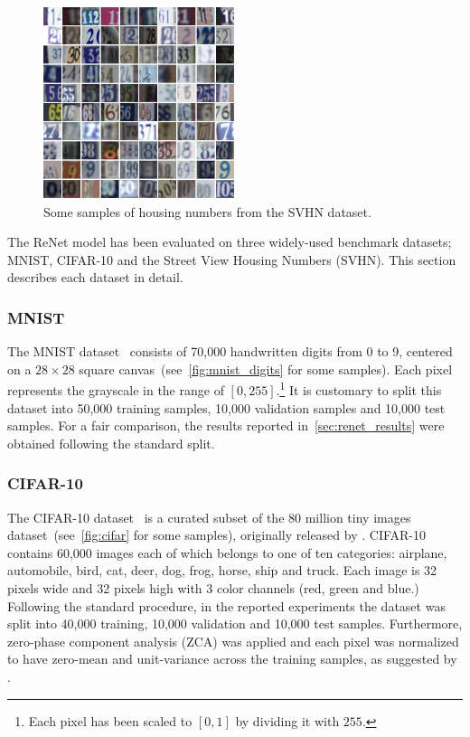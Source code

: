 \begin{figure}[!t]
    \centering
    \includegraphics[width=0.5\textwidth]{img/renet/SVHN.png}
    \caption{Some samples of housing numbers from the SVHN dataset.}
    \label{fig:svhn}
\end{figure}

The ReNet model has been evaluated on three widely-used benchmark datasets;
MNIST, CIFAR-10 and the Street View Housing Numbers (SVHN). This section
describes each dataset in detail.

\subsubsection{MNIST}
The MNIST dataset~\citep{Lecun99objectrecognition} consists of 70,000
handwritten digits from 0 to 9, centered on a $28\times 28$ square
canvas~(see~\autoref{fig:mnist_digits} for some samples). Each pixel represents
the grayscale in the range of $\left[0, 255\right]$.\footnote{Each pixel has
been scaled to $[0, 1]$ by dividing it with $255$.} It is customary to split
this dataset into 50,000 training samples, 10,000 validation samples and 10,000
test samples. For a fair comparison, the results reported
in~\autoref{sec:renet_results} were obtained following the standard split.

\subsubsection{CIFAR-10}
The CIFAR-10 dataset~\citep{KrizhevskyHinton2009} is a curated subset of the 80
million tiny images dataset~(see~\autoref{fig:cifar} for some samples),
originally released by \citet{Torralba+Fergus+Freeman-2008}. CIFAR-10 contains
60,000 images each of which belongs to one of ten categories: airplane,
automobile, bird, cat, deer, dog, frog, horse, ship and truck. Each image is 32
pixels wide and 32 pixels high with 3 color channels (red, green and blue.)
Following the standard procedure, in the reported experiments the dataset
was split into 40,000 training, 10,000 validation and 10,000 test samples.
Furthermore, zero-phase component analysis (ZCA) was applied and each pixel
was normalized to have zero-mean and unit-variance across the training samples,
as suggested by \citet{KrizhevskyHinton2009}.

